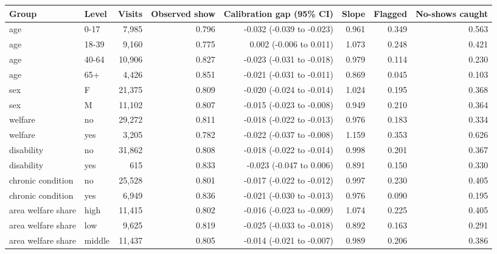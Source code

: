 \begin{tabular}{llrrrrrr}
\toprule
Group & Level & Visits & Observed show & Calibration gap (95\% CI) & Slope & Flagged & No-shows caught \\
\midrule
age & 0-17 & 7,985 & 0.796 & -0.032 (-0.039 to -0.023) & 0.961 & 0.349 & 0.563 \\
age & 18-39 & 9,160 & 0.775 & 0.002 (-0.006 to 0.011) & 1.073 & 0.248 & 0.421 \\
age & 40-64 & 10,906 & 0.827 & -0.023 (-0.031 to -0.018) & 0.979 & 0.114 & 0.230 \\
age & 65+ & 4,426 & 0.851 & -0.021 (-0.031 to -0.011) & 0.869 & 0.045 & 0.103 \\
sex & F & 21,375 & 0.809 & -0.020 (-0.024 to -0.014) & 1.024 & 0.195 & 0.368 \\
sex & M & 11,102 & 0.807 & -0.015 (-0.023 to -0.008) & 0.949 & 0.210 & 0.364 \\
welfare & no & 29,272 & 0.811 & -0.018 (-0.022 to -0.013) & 0.976 & 0.183 & 0.334 \\
welfare & yes & 3,205 & 0.782 & -0.022 (-0.037 to -0.008) & 1.159 & 0.353 & 0.626 \\
disability & no & 31,862 & 0.808 & -0.018 (-0.022 to -0.014) & 0.998 & 0.201 & 0.367 \\
disability & yes & 615 & 0.833 & -0.023 (-0.047 to 0.006) & 0.891 & 0.150 & 0.330 \\
chronic condition & no & 25,528 & 0.801 & -0.017 (-0.022 to -0.012) & 0.997 & 0.230 & 0.405 \\
chronic condition & yes & 6,949 & 0.836 & -0.021 (-0.030 to -0.013) & 0.976 & 0.090 & 0.195 \\
area welfare share & high & 11,415 & 0.802 & -0.016 (-0.023 to -0.009) & 1.074 & 0.225 & 0.405 \\
area welfare share & low & 9,625 & 0.819 & -0.025 (-0.033 to -0.018) & 0.892 & 0.163 & 0.291 \\
area welfare share & middle & 11,437 & 0.805 & -0.014 (-0.021 to -0.007) & 0.989 & 0.206 & 0.386 \\
\bottomrule
\end{tabular}
